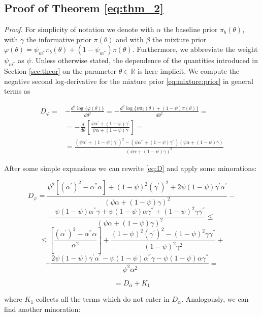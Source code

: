 \documentclass{statsoc}
\begin{document}
\subsection*{Proof of Theorem \ref{eq:thm_2}}
\begin{small}
\textit{Proof.}  For simplicity of notation we denote with $\alpha$ the baseline prior $\pi_{b}(\theta)$, with $\gamma$ the informative prior $\pi(\theta)$ and with $\beta$ the mixture prior $\varphi(\theta)= \psi_{m^{*}}\pi_{b}(\theta)+(1-\psi_{m^{*}})\pi(\theta)$. Furthermore, we abbreviate the weight $\psi_{m^{*}}$ as $\psi$. Unless otherwise stated, the dependence of the quantities introduced in Section \ref{sec:theor} on the parameter $\theta \in \mathbb{R}$ is here implicit. We compute the negative second log-derivative for the mixture prior \eqref{eq:mixture:prior} in general terms as 

\begin{align}
D_{\varphi}= &-\frac{d^{2} \log \{\varphi(\theta)\}}{d \theta^{2}}= -\frac{d^{2} \log \{\psi\pi_{b}(\theta)+(1-\psi)\pi(\theta) \}}{d \theta^{2}} =\\
& = -\frac{d}{ d\theta} \left[ \frac{\psi\alpha^{'}+(1-
\psi)\gamma^{'}}{\psi\alpha +(1-\psi)\gamma } \right]=\\
& =\frac{(\psi\alpha^{'}+(1-
\psi)\gamma^{'})^2- (\psi\alpha^{''}+(1-
\psi)\gamma^{''}) (\psi\alpha +(1-\psi)\gamma )}{(\psi\alpha +(1-\psi)\gamma )^2} 
\label{eq:D}
\end{align}

After some simple expansions we can rewrite \eqref{eq:D} and apply some minorations:

$$ D_{\varphi}=  \frac{ \psi^2 [ (\alpha^{'})^2- \alpha^{''}\alpha ] 
+(1- \psi)^2 (\gamma^{'})^2+2\psi(1- \psi) \gamma^{'}\alpha^{'}}{(\psi\alpha +(1-\psi)\gamma )^2} -$$
$$-\frac{\psi(1- \psi)\alpha^{''}\gamma+ \psi(1- \psi)\alpha\gamma^{''}+(1- \psi)^2 \gamma
\gamma^{''} }{(\psi\alpha +(1-\psi)\gamma )^2} \le $$
$$ \le \left[\frac{(\alpha^{'})^2- \alpha^{''}\alpha}{\alpha^2} \right]+ \frac{(1- \psi)^2 (\gamma^{'})^2-(1- \psi)^2 \gamma
\gamma^{''}}{(1-\psi)^2\gamma^2}+$$
$$+\frac{2\psi(1- \psi) \gamma^{'}\alpha^{'}-\psi(1- \psi)\alpha^{''}\gamma- \psi(1- \psi)\alpha\gamma^{''}}{\psi^2\alpha^2}=$$

\begin{equation}
=D_{\alpha}+ K_{1}
\label{diseq:D1}
\end{equation}

where $ K_{1}$ collects all the terms which do not enter in $D_{\alpha}$. Analogously, we can find another minoration:


\end{small}
\end{document}
